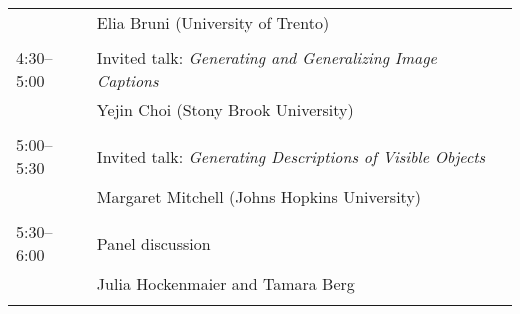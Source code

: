 \begin{tabular}{p{20mm}p{138mm}}
 & Elia Bruni (University of Trento) \\
\\
4:30--5:00 & Invited talk: {\em Generating and Generalizing Image Captions}\\
 & Yejin Choi (Stony Brook University) \\
\\
5:00--5:30 & Invited talk: {\em Generating Descriptions of Visible Objects}\\
& Margaret Mitchell (Johns Hopkins University) \\
\\
5:30--6:00 & Panel discussion\\
& Julia Hockenmaier and Tamara Berg \\
\\


\end{tabular}